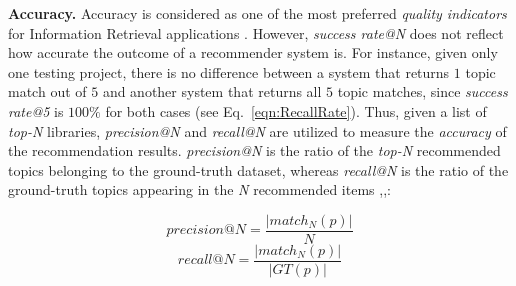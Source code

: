 \noindent \textbf{Accuracy.} Accuracy is considered as one of the most preferred \emph{quality indicators} for Information Retrieval applications \cite{Saracevic:1995:EEI:215206.215351}. However, \emph{success rate@N} does not reflect how accurate the outcome of a recommender system is. For instance, given only one testing project, there is no difference between a system that returns $1$ topic match out of $5$ and another system that returns all $5$ topic matches, since \emph{success rate@5} is $100\%$ for both cases (see Eq.~\eqref{eqn:RecallRate}). Thus, given a list of \emph{top-N} libraries, \emph{precision@N} and \emph{recall@N} are utilized to measure the \emph{accuracy} of the recommendation results. \emph{precision@N} is the ratio of the \emph{top-N} recommended topics belonging to the ground-truth dataset, whereas \emph{recall@N} is the ratio of the ground-truth topics appearing in the \emph{N} recommended items \cite{Nguyen:2019:FRS:3339505.3339636},\cite{DiNoia:2012:LOD:2362499.2362501},\cite{Davis:2006:RPR:1143844.1143874}: %


\begin{equation} \label{eqn:Precision}
precision@N = \frac{ \left | match_{N}(p) \right | }{N}
\end{equation}
\begin{equation} \label{eqn:Recall}
recall@N = \frac{ \left | match_{N}(p) \right | }{\left | GT(p) \right |}
\end{equation}









